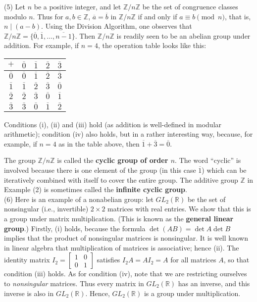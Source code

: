 \documentclass[leqno]{book}
\begin{document}
(5) Let $n$ be a positive integer, and let $\mathbb Z/n\mathbb Z$ be the set of congruence classes modulo $n$.  Thus for $a,b\in\mathbb Z$, $\overline a=\overline b$ in $\mathbb Z/n\mathbb Z$ if and only if $a\equiv b\pmod n$, that is, $n\mid(a-b)$.  Using the Division Algorithm, one observes that $\mathbb Z/n\mathbb Z=\{\overline 0,\overline 1,\dots,\overline{n-1}\}$.  Then $\mathbb Z/n\mathbb Z$ is readily seen to be an abelian group under addition.  For example, if $n=4$, the operation table looks like this:
\begin{center}
\begin{tabular}{c|cccc}
$+$ & $\overline 0$ & $\overline 1$ & $\overline 2$ & $\overline 3$\\\hline
$\overline 0$ & $\overline 0$ & $\overline 1$ & $\overline 2$ & $\overline 3$\\
$\overline 1$ & $\overline 1$ & $\overline 2$ & $\overline 3$ & $\overline 0$\\
$\overline 2$ & $\overline 2$ & $\overline 3$ & $\overline 0$ & $\overline 1$\\
$\overline 3$ & $\overline 3$ & $\overline 0$ & $\overline 1$ & $\overline 2$
\end{tabular}
\end{center}
Conditions (i), (ii) and (iii) hold (as addition is well-defined in modular arithmetic); condition (iv) also holds, but in a rather interesting way, because, for example, if $n=4$ as in the table above, then $\overline 1+\overline 3=\overline 0$.

The group $\mathbb Z/n\mathbb Z$ is called the \textbf{cyclic group of order $n$}.  The word ``cyclic'' is involved because there is one element of the group (in this case $\overline 1$) which can be iteratively combined with itself to cover the entire group.  The additive group $\mathbb Z$ in Example (2) is sometimes called the \textbf{infinite cyclic group}.\\

(6) Here is an example of a nonabelian group: let $GL_2(\mathbb R)$ be the set of nonsingular (i.e., invertible) $2\times 2$ matrices with real entries.  We show that this is a group under matrix multiplication.  (This is known as the \textbf{general linear group}.)  Firstly, (i) holds, because the formula $\det(AB)=\det A\det B$ implies that the product of nonsingular matrices is nonsingular.  It is well known in linear algebra that multiplication of matrices is associative; hence (ii).  The identity matrix $I_2=\begin{bmatrix}1&0\\0&1\end{bmatrix}$ satisfies $I_2A=AI_2=A$ for all matrices $A$, so that condition (iii) holds.  As for condition (iv), note that we are restricting ourselves to \emph{nonsingular} matrices.  Thus every matrix in $GL_2(\mathbb R)$ has an inverse, and this inverse is also in $GL_2(\mathbb R)$.  Hence, $GL_2(\mathbb R)$ is a group under multiplication.
\end{document}
